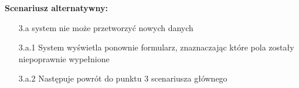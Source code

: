 \hspace{0cm}\textbf{Scenariusz alternatywny: }
\begin{enumerate}
\item[3.a] system nie może przetworzyć nowych danych
\item[3.a.1] System wyświetla ponownie formularz, znaznaczając które pola zostały niepoprawnie wypełnione
\item[3.a.2] Następuje powrót do punktu 3 scenariusza głównego
\end{enumerate}
